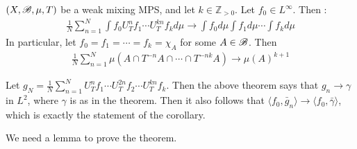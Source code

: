 \documentclass[10pt,a4paper]{report}
\newenvironment{proof}
{\begin{changemargin}{1cm}{0.5cm} 
	}%
	{\end{changemargin}
}
\begin{document}
\cor  $(X,\mathscr{B}, \mu, T)$ be a weak mixing MPS, and let $k\in \mathbb{Z}_{>0}$. Let $f_0 \in L^{\infty}$. Then :
\begin{align*}
\frac{1}{N} \sum_{n=1}^N \int f_0 U^n_T f_1 \cdots U^{kn}_T f_k d\mu \rightarrow \int f_0 d\mu \int f_1 d\mu \cdots \int f_k d\mu
\end{align*}
In particular, let $f_0 = f_1 = \cdots = f_k = \chi_A$ for some $A\in \mathscr{B}$. Then
\begin{align*}
\frac{1}{N}\sum_{n=1}^N \mu(A \cap T^{-n}A \cap \cdots \cap T^{-nk} A) \rightarrow \mu(A)^{k+1}
\end{align*}
\begin{proof}
\pf Let $g_N = \frac{1}{N} \sum_{n=1}^N U^n_T f_1 \cdots U^{2n}_T f_2 \cdots U^{kn}_T f_k$. Then the above theorem says that $g_n \rightarrow \gamma$ in $L^2$, where $\gamma$ is as in the theorem. Then it also follows that $\langle f_0, \bar{g}_n \rangle \rightarrow \langle f_0 , \bar{\gamma}\rangle$, which is exactly the statement of the corollary.

\eop
\end{proof}
\s

We need a lemma to prove the theorem.
\s
\end{document}
